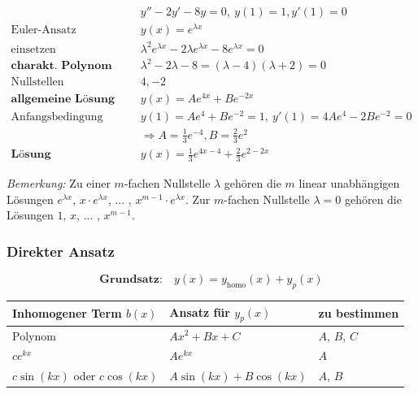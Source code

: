 \documentclass[11pt]{article}
\begin{document}
\begin{equation*}
\begin{split}
	& y'' - 2y' - 8y = 0,\ y(1) = 1, y'(1) = 0 \\
	\text{Euler-Ansatz}\quad & y(x) = e^{\lambda x} \\
	\text{einsetzen}\quad & \lambda^2 e^{\lambda x} - 2\lambda e^{\lambda x} - 8e^{\lambda x} = 0 \\
	\textbf{charakt. Polynom}\quad & \lambda^2 - 2\lambda - 8 = (\lambda - 4)(\lambda + 2) = 0 \\
	\text{Nullstellen}\quad & 4, -2 \\
	\textbf{allgemeine L{\"o}sung}\quad & y(x) = Ae^{4x} + Be^{-2x} \\
	\text{Anfangsbedingung gebrauchen}\quad & y(1) = Ae^4 + Be^{-2} = 1,\ y'(1) = 4Ae^4 - 2Be^{-2} = 0 \\
											& \Rightarrow A = \frac{1}{3}e^{-4}, B = \frac{2}{3}e^2 \\
	\textbf{L{\"o}sung}\quad & y(x) = \frac{1}{3}e^{4x-4} + \frac{2}{3}e^{2-2x}
\end{split}
\end{equation*}

\emph{Bemerkung:} Zu einer $m$-fachen Nullstelle $\lambda$ geh{\"o}ren die $m$ linear unabh{\"a}ngigen L{\"o}sungen $e^{\lambda x}$, $x\cdot e^{\lambda x}$, ... , $x^{m-1}\cdot e^{\lambda x}$. Zur $m$-fachen Nullstelle $\lambda = 0$ geh{\"o}ren die L{\"o}sungen $1$, $x$, ... , $x^{m-1}$.

\subsubsection{Direkter Ansatz}

\begin{equation*}
	\textbf{Grundsatz:}\quad y(x) = y_\text{homo}(x) + y_p(x)
\end{equation*}

\begin{table}[H]
\centering
\begin{tabular}{|l|l|l|}
\hline
\textbf{Inhomogener Term $b(x)$} & \textbf{Ansatz f{\"u}r $y_p(x)$}	& \textbf{zu bestimmen}		\\ \hline
Polynom				& $Ax^2 + Bx + C$			& $A$, $B$, $C$		\\ \hline
$c e^{k x}$ & $Ae^{kx}$					& $A$				\\ \hline
$c\sin(kx)$ oder $c\cos(kx)$ & $A\sin(kx) + B\cos(kx)$ & $A$, $B$ \\ \hline

\end{tabular}
\end{table}
\end{document}
